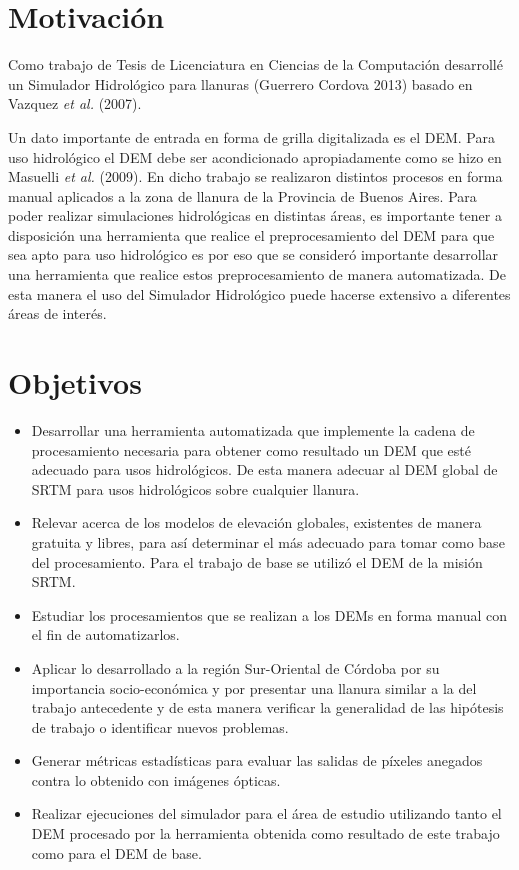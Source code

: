 \documentclass[10pt,a4paper, twoside]{report}
\begin{document}
\section{Motivación}

Como trabajo de Tesis de Licenciatura en Ciencias de la Computación desarrollé un Simulador Hidrológico para llanuras (Guerrero Cordova 2013) basado en Vazquez \textit{et al.} (2007).

Un dato importante de entrada en forma de grilla digitalizada es el DEM. Para uso hidrológico el DEM debe ser acondicionado apropiadamente como se hizo en Masuelli \textit{et al.} (2009). En dicho trabajo se realizaron distintos procesos en forma manual aplicados a la zona de llanura de la Provincia de Buenos Aires. Para poder realizar simulaciones hidrológicas en distintas áreas, es importante tener a disposición una herramienta que realice el preprocesamiento del DEM para que sea apto para uso hidrológico es por eso que se consideró importante  desarrollar una herramienta que realice estos preprocesamiento de manera automatizada. De esta manera el uso del Simulador Hidrológico puede hacerse extensivo a diferentes áreas de interés.

\section{Objetivos}


\begin{itemize}
	\item Desarrollar una herramienta automatizada que implemente la cadena de procesamiento necesaria para obtener como resultado un DEM que esté adecuado para usos hidrológicos. De esta manera adecuar al DEM global de SRTM para usos hidrológicos sobre cualquier llanura.
	\item Relevar acerca de los modelos de elevación globales, existentes de manera gratuita y libres, para así determinar el más adecuado para tomar como base del procesamiento. Para el trabajo de base se utilizó el DEM de la misión SRTM.
	\item Estudiar los procesamientos que se realizan a los DEMs en forma manual con el fin de automatizarlos.
	\item Aplicar lo desarrollado a la región Sur-Oriental de Córdoba por su importancia socio-económica y por presentar una llanura similar a la del trabajo antecedente y de esta manera verificar la generalidad de las hipótesis de trabajo o identificar nuevos problemas.
	\item Generar métricas estadísticas para evaluar las salidas de píxeles anegados contra lo obtenido con imágenes ópticas.
	\item Realizar ejecuciones del simulador para el área de estudio utilizando tanto el DEM procesado por la herramienta obtenida como resultado de este trabajo como para el DEM de base.	
\end{itemize}
\end{document}
